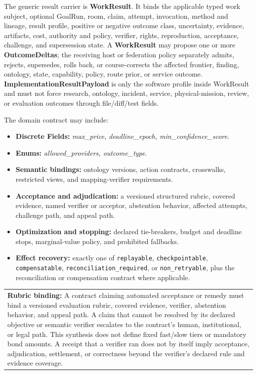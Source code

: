 \documentclass[
  11pt,
]{article}
\providecommand{\tightlist}{%
  \setlength{\itemsep}{0pt}\setlength{\parskip}{0pt}}
\begin{document}
The generic result carrier is \textbf{WorkResult}. It binds the applicable
typed work subject, optional GoalRun, room, claim, attempt, invocation, method and lineage, result profile,
positive or negative outcome class, uncertainty, evidence, artifacts, cost,
authority and policy, verifier, rights, reproduction, acceptance, challenge,
and supersession state. A \textbf{WorkResult} may propose one or more
\textbf{OutcomeDeltas}; the receiving host or federation policy separately
admits, rejects, supersedes, rolls back, or course-corrects the affected
frontier, finding, ontology, state, capability, policy, route prior, or service
outcome. \textbf{ImplementationResultPayload} is only the software profile
inside WorkResult and must not force research, ontology, incident, service,
physical-mission, review, or evaluation outcomes through file/diff/test fields.

The domain contract may include:

\begin{itemize}
\tightlist
\item
  \textbf{Discrete Fields:} \emph{max\_price, deadline\_epoch,
  min\_confidence\_score}.
\item
  \textbf{Enums:} \emph{allowed\_providers, outcome\_type}.
\item
  \textbf{Semantic bindings:} ontology versions, action contracts, crosswalks,
  restricted views, and mapping-verifier requirements.
\item
  \textbf{Acceptance and adjudication:} a versioned structured rubric,
  covered evidence, named verifier or acceptor, abstention behavior, affected
  attempts, challenge path, and appeal path.
\item
  \textbf{Optimization and stopping:} declared tie-breakers, budget and
  deadline stops, marginal-value policy, and prohibited fallbacks.
\item
  \textbf{Effect recovery:} exactly one of \texttt{replayable},
  \texttt{checkpointable}, \texttt{compensatable},
  \texttt{reconciliation\_required}, or \texttt{non\_retryable}, plus the
  reconciliation or compensation contract where applicable.
\end{itemize}

\begin{longtable}[]{@{}>{\raggedright\arraybackslash}p{\linewidth}@{}}
\toprule\noalign{}
 \\
\midrule\noalign{}
\endhead
\bottomrule\noalign{}
\endlastfoot
\textbf{Rubric binding:} A contract claiming automated acceptance or remedy
must bind a versioned evaluation rubric, covered evidence, verifier, abstention
behavior, and appeal path. A claim that cannot be resolved by its declared
objective or semantic verifier escalates to the contract's human,
institutional, or legal path. This synthesis does not define fixed fast/slow
tiers or mandatory bond amounts. A receipt that a verifier ran does not by
itself imply acceptance, adjudication, settlement, or correctness beyond the
verifier's declared rule and evidence coverage. \\
\end{longtable}
\end{document}

